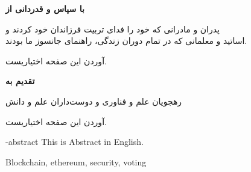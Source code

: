 \documentclass[oneside,openany,mscS]{SBU-Thesis}
\begin{document}
	
\firstPage %
\davaranPage %

{
	\newpage
	\thispagestyle{plain}
	\noindent
	\large{\textbf{با سپاس و قدردانی از}}
	
	\noindent
	پدران و مادرانی که خود را فدای تربیت فرزاندان خود کردند و\\
	اساتید و معلمانی که در تمام دوران زندگی، راهنمای جانسوز ما بودند.
	
	
	\vspace{14cm}	
	آوردن این صفحه اختیاریست.
	
	\pagebreak
}

\rightsPage %
\copyRightPage %

{
	\newpage
	\thispagestyle{plain}
	\large{\textbf{تقدیم به}}
	
	\begin{center}
		رهجويان علم و فناوری و دوست‌داران علم و دانش
	\end{center}
	
	\vspace{14cm}	
	آوردن این صفحه اختیاریست.
	
	\pagebreak
}
\tableofcontents %
\listoffigures \newpage %
\listoftables \newpage %

	
\abstractPage %
		




	

\newpage


\en-abstract
{
	This is Abstract in English.
}

\latinkeywords
{
	Blockchain, ethereum, security, voting
}

\latinAbstractPage %
\latinFirstPage %

	
\end{document}
